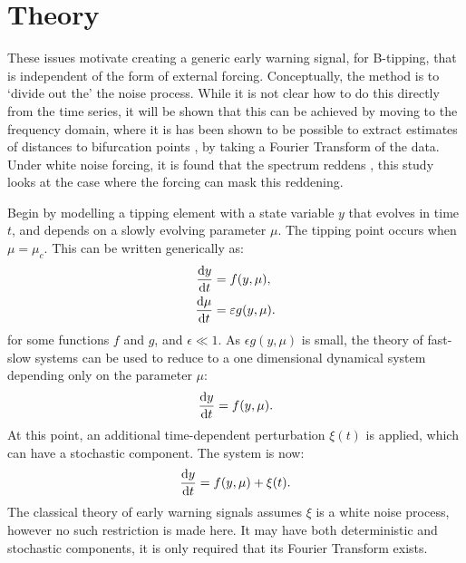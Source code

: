 \section{Theory}
\label{sec:theory}
These issues motivate creating a generic early warning signal, 
for B-tipping, that is 
independent of the form of external forcing. Conceptually,
the method is to `divide out the' the noise process.
While it is not clear
how to do this directly from the time series, it will be shown that this can be achieved by moving
to the frequency domain, where it is has been shown to be possible
to extract estimates of distances to bifurcation 
points \parencite{Kleinen2003}, by taking a Fourier Transform of the data. 
Under white noise forcing, it is found that the spectrum reddens \parencite{Kefi2014,Dakos2012c}, this study looks at the case where the forcing 
can mask this reddening.

Begin by modelling a tipping element with a state variable $y$ that evolves in time $t$, and depends on a slowly evolving parameter $\mu$.  The tipping point occurs when $\mu=\mu_c$.
This can be written generically as:
\begin{align}
\label{eq:full_syste}
    \dv{y}{t} &= f(y,\mu),\\
    \dv{\mu}{t} &= \varepsilon g(y,\mu).
\end{align}
for some functions $f$ and $g$, and $\epsilon \ll 1$.
As $\epsilon g(y,\mu)$ is small, the theory of fast-slow systems \parencite{Kuehn2011} can be used to reduce to a one
dimensional dynamical system depending only on the parameter $\mu$:
\begin{equation}
  \label{eq:1d_dynamical_sys}
  \dv{y}{t} = f(y,\mu).
\end{equation}
At this point, an additional time-dependent perturbation $\xi(t)$ is applied, which can have a stochastic component. The system is now:
\begin{equation}
  \label{eq:1d_dyn_sys_forced}
  \dv{y}{t} = f(y,\mu) + \xi(t).
\end{equation}
The classical theory of early warning signals assumes $\xi$ is a white noise process, however no such restriction is made here. It may have both
deterministic and stochastic components, it is only required that its Fourier Transform exists.

